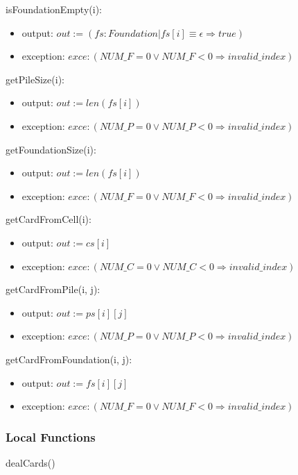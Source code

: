 \documentclass[12pt,fleqn]{article}
\begin{document}
\noindent isFoundationEmpty(i):
\begin{itemize}
\item output: $out := (fs:Foundation|fs[i]\equiv \epsilon \Rightarrow true)$
\item exception: $exce : (NUM\_F  = 0 \lor NUM\_F < 0  \Rightarrow invalid\_index)$
\end{itemize}

\noindent getPileSize(i):
\begin{itemize}
\item output: $out := len(fs[i])$
\item exception: $exce : (NUM\_P  = 0 \lor NUM\_P < 0  \Rightarrow invalid\_index)$
\end{itemize}


\noindent getFoundationSize(i):
\begin{itemize}
\item output: $out := len(fs[i])$
\item exception: $exce : (NUM\_F  = 0 \lor NUM\_F < 0  \Rightarrow invalid\_index)$
\end{itemize}


\noindent getCardFromCell(i):
\begin{itemize}
\item output: $out := cs[i]$
\item exception: $exce : (NUM\_C  = 0 \lor  NUM\_C  < 0  \Rightarrow invalid\_index)$
\end{itemize}


\noindent getCardFromPile(i, j):
\begin{itemize}
\item output: $out := ps[i][j]$
\item exception: $exce : (NUM\_P  = 0 \lor NUM\_P < 0  \Rightarrow invalid\_index)$
\end{itemize}

\noindent getCardFromFoundation(i, j):
\begin{itemize}
\item output: $out := fs[i][j]$
\item exception: $exce : (NUM\_F  = 0 \lor NUM\_F < 0  \Rightarrow invalid\_index)$
\end{itemize}


\subsubsection* {Local Functions}
\noindent dealCards()
\end{document}
